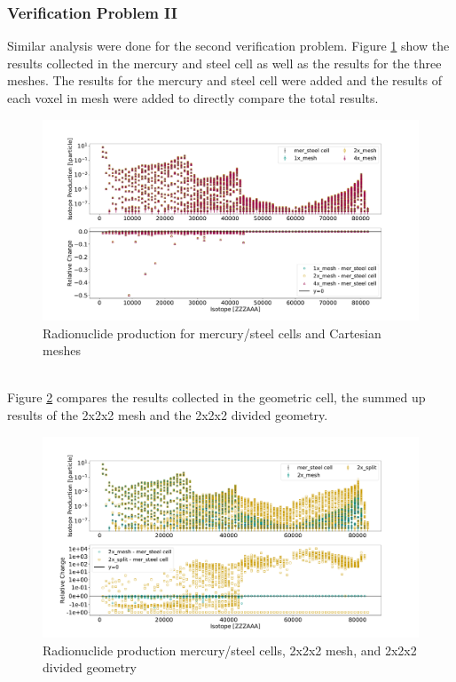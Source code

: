 \subsubsection{Verification Problem II}
Similar analysis were done for the second verification problem. Figure
\ref{fig:2prod_cell_1x_2x_4x} show the results collected in the mercury and
steel cell as well as the results for the three meshes. The results for the
mercury and steel cell were added and the results of each voxel in mesh were
added to directly compare the total results.
%
\begin{figure}[h!]
 \centering
 \includegraphics[scale=0.42,trim={2cm 1cm 3cm 2cm},clip]{../figs/toy_p2/prod_VPII_1x_2x_4x.pdf}
 \caption{Radionuclide production for mercury/steel cells and Cartesian meshes}
 \label{fig:2prod_cell_1x_2x_4x}
\end{figure}
%
\\
Figure \ref{fig:2prod_cell_2x} compares the results collected in the geometric
cell, the summed up results of the 2x2x2 mesh and the 2x2x2 divided geometry.
%
\begin{figure}[h!]
 \centering
 \includegraphics[scale=0.42,trim={3cm 1cm 3cm 3cm},clip]{../figs/toy_p2/prod_VPII_2x.pdf}
 \caption{Radionuclide production mercury/steel cells, 2x2x2 mesh, and 2x2x2 divided geometry}
 \label{fig:2prod_cell_2x}
\end{figure}
